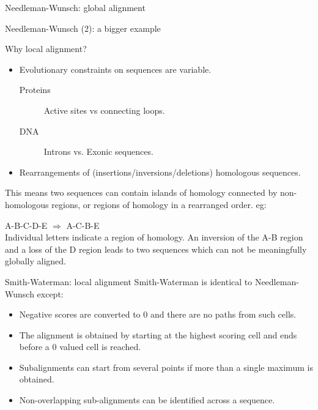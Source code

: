 \documentclass[pdf]{beamer}
\begin{document}
\begin{frame}{Needleman-Wunsch: global alignment}
  \begin{figure}[ht]
    \begin{tikzpicture}[scale=0.5]
      
    \end{tikzpicture}
  \end{figure}

\end{frame}

\begin{frame}{Needleman-Wunsch (2): a bigger example}
  \begin{figure}[ht]
    \begin{tikzpicture}[scale=0.4]
      
    \end{tikzpicture}
  \end{figure}

\end{frame}

\begin{frame}[fragile]{Why local alignment?}
  \begin{itemize}
  \item Evolutionary constraints on sequences are variable.
    \begin{description}
    \item[Proteins] Active sites vs connecting loops.
    \item[DNA] Introns vs. Exonic sequences.
    \end{description}
  \item Rearrangements of (insertions/inversions/deletions) homologous
    sequences.
  \end{itemize}
  
  This means two sequences can contain islands of homology connected
  by non-homologous regions, or regions of homology in a rearranged order. eg:

  A-B-C-D-E $\Rightarrow$ A-C-B-E\\

  {\footnotesize Individual letters indicate a region of homology. An inversion of
    the A-B region and a loss of the D region leads to two sequences which can not
    be meaningfully globally aligned. }

\end{frame}

\begin{frame}{Smith-Waterman: local alignment}
  Smith-Waterman is identical to Needleman-Wunsch except:
  \begin{itemize}
  \item Negative scores are converted to 0 and there are no
    paths from such cells.
  \item The alignment is obtained by starting at the highest
    scoring cell and ends before a 0 valued cell is reached.
  \item Subalignments can start from several points if more than a single
    maximum is obtained.
  \item Non-overlapping sub-alignments can be identified across a sequence.
  \end{itemize}
\end{frame}
\end{document}
